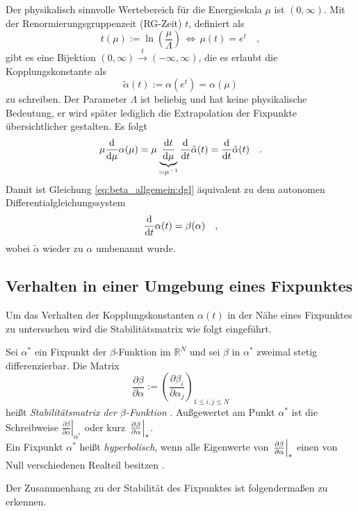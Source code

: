     Der physikalisch sinnvolle Wertebereich für die Energieskala $\mu$ ist 
    $(0,\infty)$. Mit der Renormierungsgruppenzeit (RG-Zeit) $t$, definiert als
    \begin{equation}
     t(\mu):=\ln\left(\frac{\mu}{\Lambda}\right) \,
     \Leftrightarrow \, \mu(t)=e^t \quad ,
    \end{equation}
    gibt es eine Bijektion $(0,\infty)\overset{t}{\longrightarrow}
    (-\infty,\infty)$, die es erlaubt die Kopplungskonstante als 
    \begin{equation}
    \tilde{\alpha}(t):=\alpha\left(e^t\right)=\alpha(\mu)
    \end{equation}
    zu schreiben. Der Parameter $\Lambda$ ist beliebig und hat keine 
    physikalische Bedeutung, er wird später lediglich die Extrapolation der 
    Fixpunkte übersichtlicher gestalten. Es folgt
    \begin{equation}
     \mu\frac{\text{d}}{\text{d}\mu}\alpha(\mu) = \mu \underbrace{\frac{\text{d} t}{\text{d} \mu}}_{=\mu^{-1}}
     \frac{\text{d}}{\text{d} t} \tilde{\alpha}(t)
     =\frac{\text{d}}{\text{d} t} \tilde{\alpha}(t) \quad .
    \end{equation}
    Damit ist Gleichung \eqref{eq:beta_allgemein:dgl} äquivalent zu dem 
    autonomen Differentialgleichungssystem 
    \begin{equation}
     \frac{\text{d}}{\text{d} t} \alpha(t)=\beta(\alpha) \quad , 
     \label{eq:beta_allgemein:dgl_alpha}
    \end{equation}
    wobei $\tilde{\alpha}$ wieder zu $\alpha$ umbenannt wurde.
    
  \subsection{Verhalten in einer Umgebung eines Fixpunktes}\label{beta_allgemein:Verhalten}
    Um das Verhalten der Kopplungskonstanten $\alpha(t)$ in der Nähe eines 
    Fixpunktes zu untersuchen wird die Stabilitätsmatrix wie folgt eingeführt.
    \begin{definition}
    Sei $\alpha^*$ ein Fixpunkt der $\beta$-Funktion im $\mathbb{R}^N$ und 
    sei $\beta$ in 
    $\alpha^*$ zweimal stetig differenzierbar. Die Matrix
    \begin{equation}
     \frac{\partial \beta}{\partial \alpha}:= 
     \left( \frac{\partial \beta_i}{\partial \alpha_j} \right)_{1\leq i,j 
     \leq N}
    \end{equation}
    heißt \textit{Stabilitätsmatrix der $\beta$-Funktion} \cite{GR_Weinberg}. 
    Außgewertet am Punkt $\alpha^*$ 
    ist die Schreibweise $\left.\frac{\partial \beta}{\partial \alpha}
    \right|_{\alpha^*}$ oder kurz $\left.\frac{\partial \beta}{\partial \alpha}\right|_*$.\\
    Ein Fixpunkt $\alpha^*$ heißt \textit{hyperbolisch}, wenn alle Eigenwerte 
    von $\left.\frac{\partial \beta}{\partial \alpha}\right|_*$ einen von Null verschiedenen Realteil besitzen 
    \cite{Bronstein4}.
    \end{definition}
    Der Zusammenhang zu der Stabilität des Fixpunktes ist folgendermaßen zu 
    erkennen. 
    
